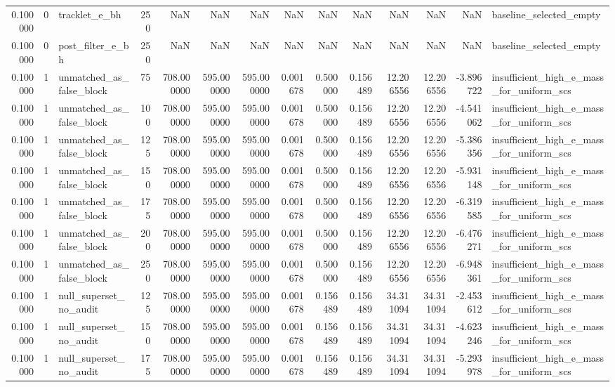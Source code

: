 \begin{tabular}{rrlrrrrrrrrrrl}
0.100000 & 0 & tracklet_e_bh & 250 & NaN & NaN & NaN & NaN & NaN & NaN & NaN & NaN & NaN & baseline_selected_empty \\
0.100000 & 0 & post_filter_e_bh & 250 & NaN & NaN & NaN & NaN & NaN & NaN & NaN & NaN & NaN & baseline_selected_empty \\
0.100000 & 1 & unmatched_as_false_block & 75 & 708.000000 & 595.000000 & 595.000000 & 0.001678 & 0.500000 & 0.156489 & 12.206556 & 12.206556 & -3.896722 & insufficient_high_e_mass_for_uniform_scs \\
0.100000 & 1 & unmatched_as_false_block & 100 & 708.000000 & 595.000000 & 595.000000 & 0.001678 & 0.500000 & 0.156489 & 12.206556 & 12.206556 & -4.541062 & insufficient_high_e_mass_for_uniform_scs \\
0.100000 & 1 & unmatched_as_false_block & 125 & 708.000000 & 595.000000 & 595.000000 & 0.001678 & 0.500000 & 0.156489 & 12.206556 & 12.206556 & -5.386356 & insufficient_high_e_mass_for_uniform_scs \\
0.100000 & 1 & unmatched_as_false_block & 150 & 708.000000 & 595.000000 & 595.000000 & 0.001678 & 0.500000 & 0.156489 & 12.206556 & 12.206556 & -5.931148 & insufficient_high_e_mass_for_uniform_scs \\
0.100000 & 1 & unmatched_as_false_block & 175 & 708.000000 & 595.000000 & 595.000000 & 0.001678 & 0.500000 & 0.156489 & 12.206556 & 12.206556 & -6.319585 & insufficient_high_e_mass_for_uniform_scs \\
0.100000 & 1 & unmatched_as_false_block & 200 & 708.000000 & 595.000000 & 595.000000 & 0.001678 & 0.500000 & 0.156489 & 12.206556 & 12.206556 & -6.476271 & insufficient_high_e_mass_for_uniform_scs \\
0.100000 & 1 & unmatched_as_false_block & 250 & 708.000000 & 595.000000 & 595.000000 & 0.001678 & 0.500000 & 0.156489 & 12.206556 & 12.206556 & -6.948361 & insufficient_high_e_mass_for_uniform_scs \\
0.100000 & 1 & null_superset_no_audit & 125 & 708.000000 & 595.000000 & 595.000000 & 0.001678 & 0.156489 & 0.156489 & 34.311094 & 34.311094 & -2.453612 & insufficient_high_e_mass_for_uniform_scs \\
0.100000 & 1 & null_superset_no_audit & 150 & 708.000000 & 595.000000 & 595.000000 & 0.001678 & 0.156489 & 0.156489 & 34.311094 & 34.311094 & -4.623246 & insufficient_high_e_mass_for_uniform_scs \\
0.100000 & 1 & null_superset_no_audit & 175 & 708.000000 & 595.000000 & 595.000000 & 0.001678 & 0.156489 & 0.156489 & 34.311094 & 34.311094 & -5.293978 & insufficient_high_e_mass_for_uniform_scs \\

\end{tabular}
